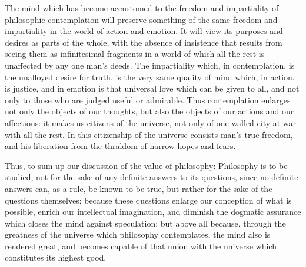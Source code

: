 The mind which has become accustomed to the freedom and impartiality
of philosophic contemplation will preserve something of the same
freedom and impartiality in the world of action and emotion. It will
view its purposes  and desires as parts of the whole, with
the absence of insistence that results from seeing them as
infinitesimal fragments in a world of which all the rest is unaffected
by any one man's deeds. The impartiality which, in contemplation, is
the unalloyed desire for truth, is the very same quality of mind
which, in action, is justice, and in emotion is that universal love
which can be given to all, and not only to those who are judged useful
or admirable. Thus contemplation enlarges not only the objects of our
thoughts, but also the objects of our actions and our affections: it
makes us citizens of the universe, not only of one walled city at war
with all the rest. In this citizenship of the universe consists man's
true freedom, and his liberation from the thraldom of narrow hopes and
fears.

Thus, to sum up our discussion of the value of philosophy: Philosophy
is to be studied, not for the sake of any definite answers to its
questions, since no definite answers can, as a rule, be known to be
true, but rather for the sake of the questions themselves; because
these questions enlarge our conception of what  is possible,
enrich our intellectual imagination, and diminish the dogmatic
assurance which closes the mind against speculation; but above all
because, through the greatness of the universe which philosophy
contemplates, the mind also is rendered great, and becomes capable of
that union with the universe which constitutes its highest good.

